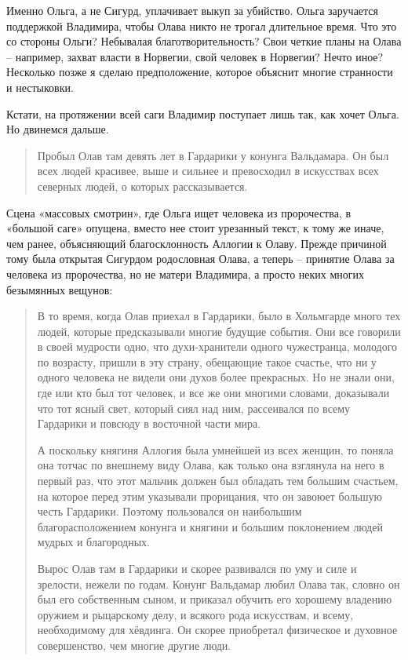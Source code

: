 Именно Ольга, а не Сигурд, уплачивает выкуп за убийство. Ольга заручается поддержкой Владимира, чтобы Олава никто не трогал длительное время. Что это со стороны Ольги? Небывалая благотворительность? Свои четкие планы на Олава – например, захват власти в Норвегии, свой человек в Норвегии? Нечто иное? Несколько позже я сделаю предположение, которое объяснит многие странности и нестыковки.

Кстати, на протяжении всей саги Владимир поступает лишь так, как хочет Ольга. Но двинемся дальше.

\begin{quotation}
Пробыл Олав там девять лет в Гардарики у конунга Вальдамара. Он был всех людей красивее, выше и сильнее и превосходил в искусствах всех северных людей, о которых рассказывается.
\end{quotation}

Сцена «массовых смотрин», где Ольга ищет человека из пророчества, в «большой саге» опущена, вместо нее стоит урезанный текст, к тому же иначе, чем ранее, объясняющий благосклонность Аллогии к Олаву. Прежде причиной тому была открытая Сигурдом родословная Олава, а теперь – принятие Олава за человека из пророчества, но не матери Владимира, а просто неких многих безымянных вещунов:

\begin{quotation}
В то время, когда Олав приехал в Гардарики, было в Хольмгарде много тех людей, которые предсказывали многие будущие события. Они все говорили в своей мудрости одно, что духи-хранители одного чужестранца, молодого по возрасту, пришли в эту страну, обещающие такое счастье, что ни у одного человека не видели они духов более прекрасных. Но не знали они, где или кто был тот человек, и все же они многими словами, доказывали что тот ясный свет, который сиял над ним, рассеивался по всему Гардарики и повсюду в восточной части мира. 

А поскольку княгиня Аллогия была умнейшей из всех женщин, то поняла она тотчас по внешнему виду Олава, как только она взглянула на него в первый раз, что этот мальчик должен был обладать тем большим счастьем, на которое перед этим указывали прорицания, что он завоюет большую честь Гардарики. Поэтому пользовался он наибольшим благорасположением конунга и княгини и большим поклонением людей мудрых и благородных. 

Вырос Олав там в Гардарики и скорее развивался по уму и силе и зрелости, нежели по годам. Конунг Вальдамар любил Олава так, словно он был его собственным сыном, и приказал обучить его хорошему владению оружием и рыцарскому делу, и всякого рода искусствам, и всему, необходимому для хёвдинга. Он скорее приобретал физическое и духовное совершенство, чем многие другие люди.
\end{quotation}

